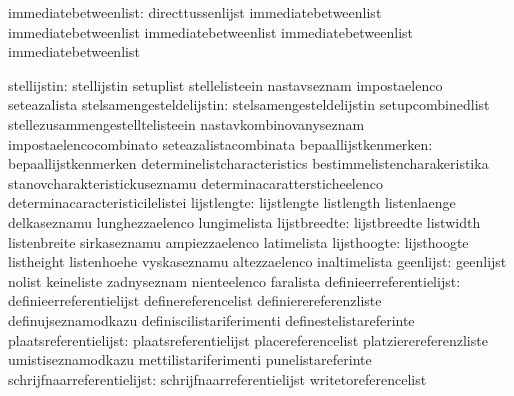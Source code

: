             immediatebetweenlist: directtussenlijst                immediatebetweenlist
                                  immediatebetweenlist             immediatebetweenlist
                                  immediatebetweenlist             immediatebetweenlist

                    stellijstin:  stellijstin                      setuplist
                                  stellelisteein                   nastavseznam
                                  impostaelenco                    seteazalista
       stelsamengesteldelijstin:  stelsamengesteldelijstin         setupcombinedlist
                                  stellezusammengestelltelisteein  nastavkombinovanyseznam
                                  impostaelencocombinato           seteazalistacombinata
           bepaallijstkenmerken:  bepaallijstkenmerken             determinelistcharacteristics
                                  bestimmelistencharakeristika     stanovcharakteristickuseznamu
                                  determinacarattersticheelenco    determinacaracteristicilelistei
                    lijstlengte:  lijstlengte                      listlength
                                  listenlaenge                     delkaseznamu
                                  lunghezzaelenco                  lungimelista
                   lijstbreedte:  lijstbreedte                     listwidth
                                  listenbreite                     sirkaseznamu
                                  ampiezzaelenco                   latimelista
                    lijsthoogte:  lijsthoogte                      listheight
                                  listenhoehe                      vyskaseznamu
                                  altezzaelenco                    inaltimelista
                      geenlijst:  geenlijst                        nolist
                                  keineliste                       zadnyseznam
                                  nienteelenco                     faralista
        definieerreferentielijst: definieerreferentielijst         definereferencelist
                                  definierereferenzliste           definujseznamodkazu
                                  definiscilistariferimenti        definestelistareferinte
           plaatsreferentielijst: plaatsreferentielijst            placereferencelist
                                  platzierereferenzliste           umistiseznamodkazu
                                  mettilistariferimenti            punelistareferinte
      schrijfnaarreferentielijst: schrijfnaarreferentielijst       writetoreferencelist
